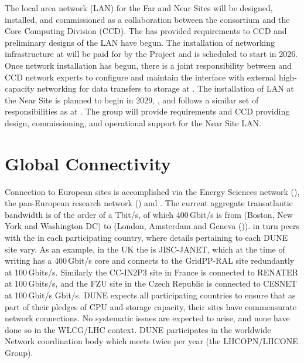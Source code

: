 \documentclass[../main-v1.tex]{subfiles}
\begin{document}
The local area network (LAN) for the Far and Near Sites will be designed, installed, and commissioned as a collaboration between the   %
consortium and the  Core Computing Division (CCD). The  has provided requirements to CCD and preliminary designs of the LAN have begun. The installation of networking infrastructure at  will be paid for by the %
 Project 
and is scheduled to start in %
2026. Once network installation has begun, there is a joint responsibility between  and CCD network experts to configure and maintain the interface with external high-capacity networking for data transfers to storage at . The installation of LAN at the Near Site is planned to begin in %
2029, , and follows a similar set of responsibilities as at . The  group will provide requirements and CCD providing design, commissioning, and operational support for the Near Site LAN.

\section{Global Connectivity}
Connection to European sites is accomplished via the Energy Sciences network (),
the pan-European research network () and .
The current aggregate  transatlantic bandwidth is of the order of a Tbit/s, of which 400\,Gbit/s is from   (Boston, New York and Washington DC)
to  (London, Amsterdam and Geneva ()).
 in turn peers with the    in each participating country, where details
pertaining to each DUNE site vary. As an example, in the UK the
 is JISC-JANET, which at the time of writing has a 400\,Gbit/s core and connects to the GridPP-RAL site redundantly at 100\,Gbits/s.
Similarly the CC-IN2P3 site in France is connected to RENATER at 100\,Gbits/s, and the FZU site in the Czech Republic is connected to CESNET
at 100\,Gbit/s Gbit/s.  DUNE expects all participating countries to
ensure that as part of their pledges of CPU and storage capacity, %
their sites %
have commensurate network connections. %
No systematic issues are expected to arise, and none have done so in the
WLCG/LHC context. DUNE participates in the worldwide  Network
coordination body which meets twice per year  (the LHCOPN/LHCONE Group).
\end{document}
